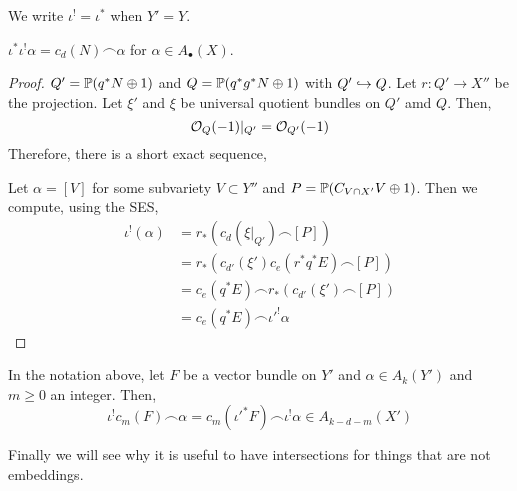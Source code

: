 \documentclass[12pt]{article}
\begin{document}
\begin{rmk}
We write $\iota^! = \iota^*$ when $Y' = Y$.
\end{rmk}

\begin{cor}
$\iota^* \iota^! \alpha = c_d(N) \frown \alpha$ for $\alpha \in A_\bullet(X)$.
\end{cor}

\begin{proof}
$Q' = \P(q^* N \oplus 1)$ and $Q = \P(q^* g^* N \oplus 1)$ with $Q' \embed Q$. Let $r : Q' \to X''$ be the projection. Let $\xi'$ and $\xi$ be universal quotient bundles on $Q'$ amd $Q$. Then,
\[ \struct{Q}(-1)|_{Q'} = \struct{Q'}(-1) \]
Therefore, there is a short exact sequence,
\begin{center}
\end{center}
Let $\alpha = [V]$ for some subvariety $V \subset Y''$ and $P = \P(C_{V \cap X'} V \oplus 1)$. Then we compute, using the SES,
\begin{align*} 
\iota^!(\alpha) &= r_*(c_d(\xi|_{Q'}) \frown [P])
\\
&= r_*(c_{d'}(\xi') c_e(r^* q^* E) \frown [P])
\\
& = c_e(q^* E) \frown r_*(c_{d'}(\xi') \frown [P]) 
\\
& = c_e(q^* E) \frown \iota'^! \alpha 
\end{align*}
\end{proof}

\begin{prop}
In the notation above, let $F$ be a vector bundle on $Y'$ and $\alpha \in A_k(Y')$ and $m \ge 0$ an integer. Then,
\[ \iota^! c_m(F) \frown \alpha = c_m(\iota'^* F) \frown \iota^! \alpha \in A_{k-d-m}(X') \]
\end{prop}

\begin{rmk}
Finally we will see why it is useful to have intersections for things that are not embeddings. 
\end{rmk}
\end{document}

